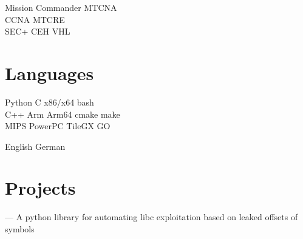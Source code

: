 \documentclass[]{resume}
\begin{document}
\begin{minipage}[t]{0.30\textwidth}
\sectionsep

Mission Commander \textbullet{} MTCNA \\
CCNA \textbullet{} MTCRE \\
SEC+ \textbullet{} CEH \textbullet{} VHL \\


\sectionsep


\section{Languages}
Python \textbullet{} C \textbullet{} x86/x64 \textbullet{} bash \\
\sectionsep
{}
C++ \textbullet{} Arm \textbullet{} Arm64 \textbullet{} cmake \textbullet{} make \\
\sectionsep
{}
MIPS \textbullet{} PowerPC \textbullet{} TileGX \textbullet{} GO \\

\sectionsep

English \textbullet{} German \\



\section{Projects}
\href{https://github.com/jhilbs3/pwnc}{} --- A python library for automating libc exploitation based on leaked offsets of symbols \\

%
%

\end{minipage}
\hfill
\end{document}
